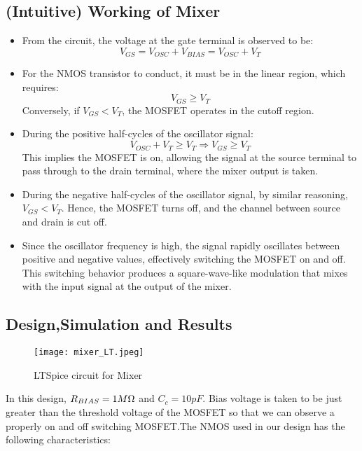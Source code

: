 \documentclass[conference]{IEEEtran}
\begin{document}
\subsection{(Intuitive) Working of Mixer}
\begin{itemize}
    \item From the circuit, the voltage at the gate terminal is observed to be:
    \[
    V_{GS} = V_{OSC} + V_{BIAS} = V_{OSC} + V_T
    \]
    
    \item For the NMOS transistor to conduct, it must be in the linear region, which requires:
    \[
    V_{GS} \geq V_T
    \]
    Conversely, if \( V_{GS} < V_T \), the MOSFET operates in the cutoff region.
    
    \item During the positive half-cycles of the oscillator signal:
    \[
    V_{OSC} + V_T \geq V_T \Rightarrow V_{GS} \geq V_T
    \]
    This implies the MOSFET is on, allowing the signal at the source terminal to pass through to the drain terminal, where the mixer output is taken.
    
    \item During the negative half-cycles of the oscillator signal, by similar reasoning, \( V_{GS} < V_T \). Hence, the MOSFET turns off, and the channel between source and drain is cut off.
    
    \item Since the oscillator frequency is high, the signal rapidly oscillates between positive and negative values, effectively switching the MOSFET on and off. This switching behavior produces a square-wave-like modulation that mixes with the input signal at the output of the mixer.
\end{itemize}

\subsection{Design,Simulation and Results}
\begin{figure}[H]
\centering
\texttt{[image: mixer\_LT.jpeg]}
\caption{LTSpice circuit for Mixer}
\end{figure}

In this design, $R_{BIAS} = 1M\ohm$  and $C_c = 10pF$. Bias voltage is taken to be just greater than the threshold voltage of the MOSFET so that we can
observe a properly on and off switching MOSFET.The NMOS used in our
design has the following characteristics:
\end{document}
